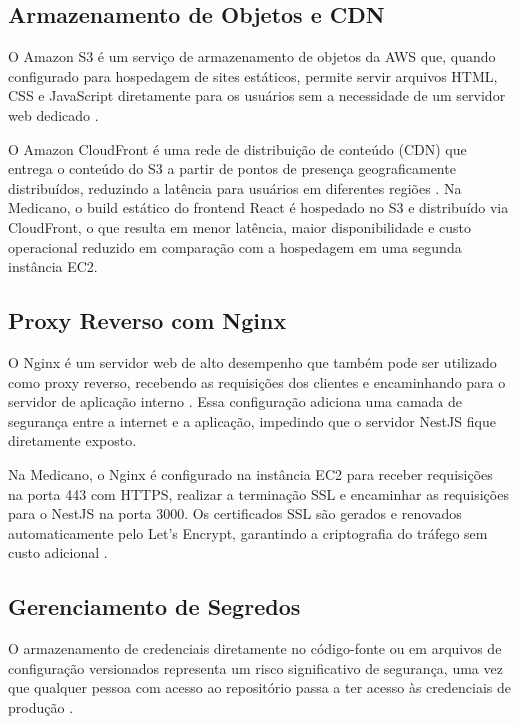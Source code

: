 \subsection{Armazenamento de Objetos e CDN}
\label{subsec:s3-cloudfront}

O Amazon S3 é um serviço de armazenamento de objetos
da AWS que, quando configurado para hospedagem de
sites estáticos, permite servir arquivos HTML, CSS e
JavaScript diretamente para os usuários sem a
necessidade de um servidor web dedicado \cite{awss3}.

O Amazon CloudFront é uma rede de distribuição de
conteúdo (CDN) que entrega o conteúdo do S3 a partir
de pontos de presença geograficamente distribuídos,
reduzindo a latência para usuários em diferentes
regiões \cite{awscf}. Na Medicano, o build estático
do frontend React é hospedado no S3 e distribuído
via CloudFront, o que resulta em menor latência,
maior disponibilidade e custo operacional reduzido
em comparação com a hospedagem em uma segunda
instância EC2.

\subsection{Proxy Reverso com Nginx}
\label{subsec:nginx}

O Nginx é um servidor web de alto desempenho que
também pode ser utilizado como proxy reverso,
recebendo as requisições dos clientes e encaminhando
para o servidor de aplicação interno \cite{reese2008}.
Essa configuração adiciona uma camada de segurança
entre a internet e a aplicação, impedindo que o
servidor NestJS fique diretamente exposto.

Na Medicano, o Nginx é configurado na instância EC2
para receber requisições na porta 443 com HTTPS,
realizar a terminação SSL e encaminhar as requisições
para o NestJS na porta 3000. Os certificados SSL são
gerados e renovados automaticamente pelo Let's Encrypt,
garantindo a criptografia do tráfego sem custo adicional
\cite{reese2008}.

\subsection{Gerenciamento de Segredos}
\label{subsec:secrets}

O armazenamento de credenciais diretamente no
código-fonte ou em arquivos de configuração versionados
representa um risco significativo de segurança, uma
vez que qualquer pessoa com acesso ao repositório
passa a ter acesso às credenciais de produção
\cite{awssm}.

